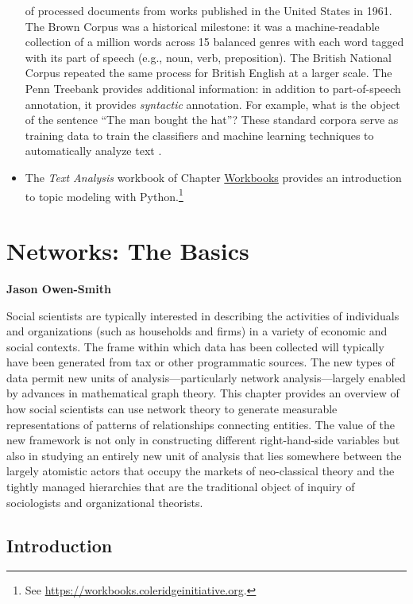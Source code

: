 \documentclass[]{krantz}
\begin{document}
\begin{itemize}
  of processed documents from works published in the United States in
  1961. The Brown Corpus was a historical milestone: it was a
  machine-readable collection of a million words across 15 balanced
  genres with each word tagged with its part of speech (e.g., noun,
  verb, preposition). The British National Corpus \citep{bnc} repeated
  the same process for British English at a larger scale. The Penn
  Treebank \citep{marcus-93} provides additional information: in
  addition to part-of-speech annotation, it provides \emph{syntactic}
  annotation. For example, what is the object of the sentence ``The man
  bought the hat''? These standard corpora serve as training data to
  train the classifiers and machine learning techniques to automatically
  analyze text \citep{halevy-09}.
\item
  The \emph{Text Analysis} workbook of Chapter
  \protect\hyperlink{chap:workbooks}{Workbooks} provides an introduction
  to topic modeling with Python.\footnote{See
    \url{https://workbooks.coleridgeinitiative.org}.}
\end{itemize}

\hypertarget{chap:networks}{\chapter{Networks: The
Basics}\label{chap:networks}}

\textbf{Jason Owen-Smith}

Social scientists are typically interested in describing the activities
of individuals and organizations (such as households and firms) in a
variety of economic and social contexts. The frame within which data has
been collected will typically have been generated from tax or other
programmatic sources. The new types of data permit new units of
analysis---particularly network analysis---largely enabled by advances
in mathematical graph theory. This chapter provides an overview of how
social scientists can use network theory to generate measurable
representations of patterns of relationships connecting entities. The
value of the new framework is not only in constructing different
right-hand-side variables but also in studying an entirely new unit of
analysis that lies somewhere between the largely atomistic actors that
occupy the markets of neo-classical theory and the tightly managed
hierarchies that are the traditional object of inquiry of sociologists
and organizational theorists.

\section{Introduction}\label{introduction-3}
\end{document}
